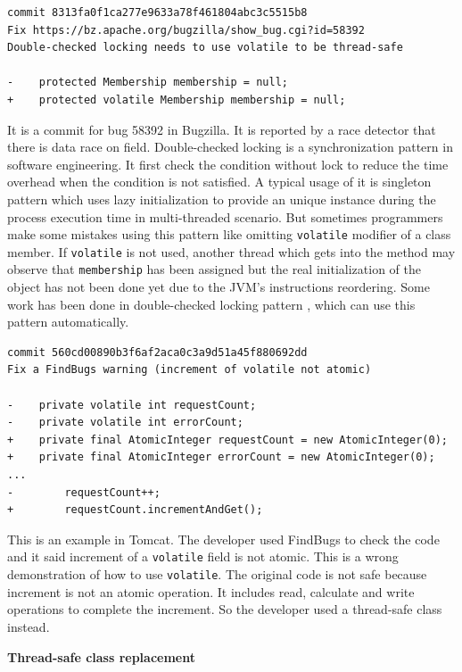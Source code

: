 \documentclass[conference]{IEEEtran}
\begin{document}
\begin{lstlisting}
commit 8313fa0f1ca277e9633a78f461804abc3c5515b8
Fix https://bz.apache.org/bugzilla/show_bug.cgi?id=58392
Double-checked locking needs to use volatile to be thread-safe

-    protected Membership membership = null;
+    protected volatile Membership membership = null;
\end{lstlisting}
It is a commit for bug 58392 in Bugzilla. It is reported by a race detector that there is data race on field. Double-checked locking is a synchronization pattern in software engineering. It first check the condition without lock to reduce the time overhead when the condition is not satisfied. A typical usage of it is singleton pattern which uses lazy initialization to provide an unique instance during the process execution time in multi-threaded scenario. But sometimes programmers make some mistakes using this pattern like omitting \texttt{volatile} modifier of a class member. If \texttt{volatile} is not used, another thread which gets into the method may observe that \texttt{membership} has been assigned but the real initialization of the object has not been done yet due to the JVM's instructions reordering. Some work has been done in double-checked locking pattern \cite{conf/ispass/IshizakiDN14}, which can use this pattern automatically.

\begin{lstlisting}
commit 560cd00890b3f6af2aca0c3a9d51a45f880692dd
Fix a FindBugs warning (increment of volatile not atomic)

-    private volatile int requestCount;
-    private volatile int errorCount;
+    private final AtomicInteger requestCount = new AtomicInteger(0);
+    private final AtomicInteger errorCount = new AtomicInteger(0);
...
-        requestCount++;
+        requestCount.incrementAndGet();
\end{lstlisting}

This is an example in Tomcat. The developer used FindBugs to check the code and it said increment of a \texttt{volatile} field is not atomic. This is a wrong demonstration of how to use \texttt{volatile}. The original code is not safe because increment is not an atomic operation. It includes read, calculate and write operations to complete the increment. So the developer used a thread-safe class instead.

\textbf{Thread-safe class replacement}
\end{document}
